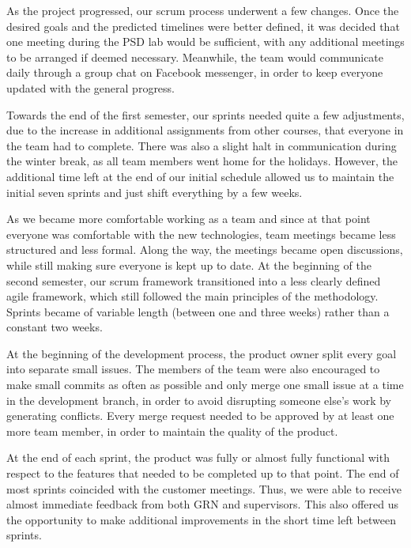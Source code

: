 \documentclass{l3proj}
\begin{document}
 As the project progressed, our scrum process underwent a few changes. Once the desired goals and the predicted timelines were better defined, it was decided that one meeting during the PSD lab would be sufficient, with any additional meetings to be arranged if deemed necessary. Meanwhile, the team would communicate daily through a group chat on Facebook messenger, in order to keep everyone updated with the general progress.

 Towards the end of the first semester, our sprints needed quite a few adjustments, due to the increase in additional assignments from other courses, that everyone in the team had to complete. There was also a slight halt in communication during the winter break, as all team members went home for the holidays. However, the additional time left at the end of our initial schedule allowed us to maintain the initial seven sprints and just shift everything by a few weeks.

 As we became more comfortable working as a team and since at that point everyone was comfortable with the new technologies, team meetings became less structured and less formal. Along the way, the meetings became open discussions, while still making sure everyone is kept up to date. At the beginning of the second semester, our scrum framework transitioned into a less clearly defined agile framework, which still followed the main principles of the methodology. Sprints became of variable length (between one and three weeks) rather than a constant two weeks.

 

 At the beginning of the development process, the product owner split every goal into separate small issues. The members of the team were also encouraged to make small commits as often as possible and only merge one small issue at a time in the development branch, in order to avoid disrupting someone else's work by generating conflicts. Every merge request needed to be approved by at least one more team member, in order to maintain the quality of the product.

 At the end of each sprint, the product was fully or almost fully functional with respect to the features that needed to be completed up to that point. The end of most sprints coincided with the customer meetings. Thus, we were able to receive almost immediate feedback from both GRN and supervisors. This also offered us the opportunity to make additional improvements in the short time left between sprints.
\end{document}
